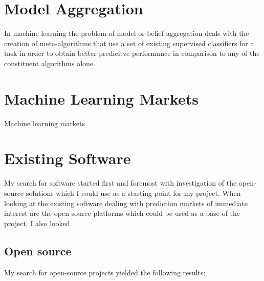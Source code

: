 \documentclass[bsc,frontabs,twoside,singlespacing,parskip,deptreport]{infthesis}     %
\begin{document}
\section{Model Aggregation}
	In machine learning the problem of model or belief aggregation deals with the creation of meta-algorithms that use a set of existing supervised classifiers for a task in order to obtain better predicitve performance in comparison to any of the constituent algorithms alone. 

\section{Machine Learning Markets}
    Machine learning markets 

\section{Existing Software}
% 
	My search for software started first and foremost with  investigation of the open-source solutions which I could use as a starting point for my project. 
	When looking at the existing software dealing with prediction markets of immediate interest are the open source platforms which could be used as a base of the project. I also looked 

\subsection{Open source}
	My search for open-source projects yielded the following results:
\end{document}
